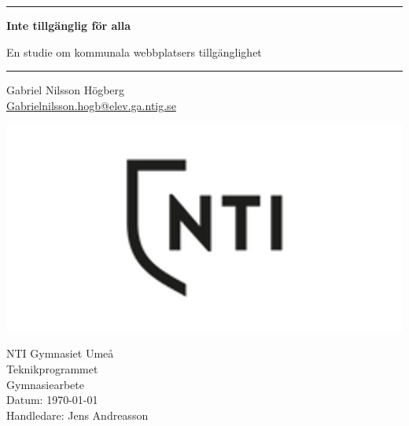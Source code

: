 \documentclass[11p]{article}
\begin{document}
    \begin{titlepage}
        \centering

        \vspace*{1cm}

        \rule{\textwidth}{1pt}

        \vspace{.7\baselineskip}
        {\huge \textbf{Inte tillgänglig för alla}}

        \vspace*{.5cm}
        {\LARGE En studie om kommunala webbplatsers tillgänglighet}

        \rule{\textwidth}{1pt}

        \vspace{1cm}

        \large

        \begin{minipage}{.5\textwidth}
            \centering
            Gabriel Nilsson Högberg \\
            {\normalsize \url{Gabrielnilsson.hogb@elev.ga.ntig.se}}
        \end{minipage}%

        \vspace{3cm}

        \includegraphics[width=.7\textwidth]{../images/nti_logo.png}

        \vfill

        NTI Gymnasiet Umeå \\
        Teknikprogrammet\\
        Gymnasiearbete\\
        Datum: \today \\
        Handledare: Jens Andreasson
    \end{titlepage}
\end{document}
